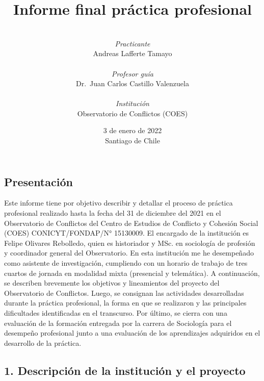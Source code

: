 \documentclass[
  12pt,
]{article}
\title{\vspace{2cm} \textbf{Informe final práctica profesional}}
\author{\vspace{0.5cm}\\
\emph{Practicante}\\
Andreas Lafferte Tamayo\\
\vspace{0.5cm}\\
\emph{Profesor guía}\\
Dr.~Juan Carlos Castillo Valenzuela\\
\vspace{0.5cm}\\
\emph{Institución}\\
Observatorio de Conflictos (COES)\\
\vspace{1cm}}
\date{3 de enero de 2022\\
Santiago de Chile}
\begin{document}
\maketitle

\hypertarget{presentaciuxf3n}{%
\subsection{Presentación}\label{presentaciuxf3n}}

\doublespacing

Este informe tiene por objetivo describir y detallar el proceso de
práctica profesional realizado hasta la fecha del 31 de diciembre del
2021 en el Observatorio de Conflictos del Centro de Estudios de
Conflicto y Cohesión Social (COES) CONICYT/FONDAP/N° 15130009. El
encargado de la institución es Felipe Olivares Rebolledo, quien es
historiador y MSc. en sociología de profesión y coordinador general del
Observatorio. En esta institución me he desempeñado como asistente de
investigación, cumpliendo con un horario de trabajo de tres cuartos de
jornada en modalidad mixta (presencial y telemática). A continuación, se
describen brevemente los objetivos y lineamientos del proyecto del
Observatorio de Conflictos. Luego, se consignan las actividades
desarrolladas durante la práctica profesional, la forma en que se
realizaron y las principales dificultades identificadas en el
transcurso. Por último, se cierra con una evaluación de la formación
entregada por la carrera de Sociología para el desempeño profesional
junto a una evaluación de los aprendizajes adquiridos en el desarrollo
de la práctica.

\hypertarget{descripciuxf3n-de-la-instituciuxf3n-y-el-proyecto}{%
\subsection{1. Descripción de la institución y el
proyecto}\label{descripciuxf3n-de-la-instituciuxf3n-y-el-proyecto}}

\doublespacing
\end{document}
